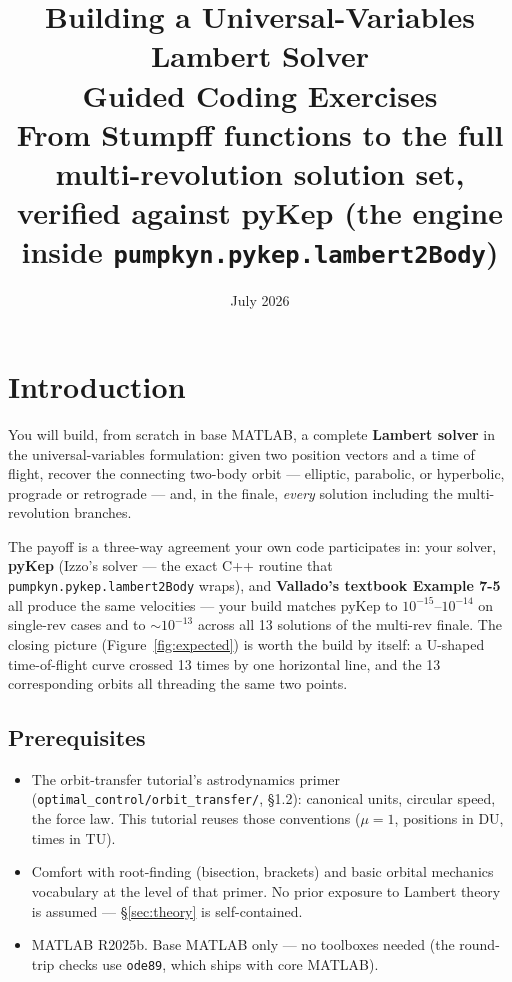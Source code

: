 \documentclass[11pt,letterpaper]{article}
\title{\textbf{Building a Universal-Variables Lambert Solver}\\[8pt]
\large Guided Coding Exercises\\[4pt]
\normalsize From Stumpff functions to the full multi-revolution solution set,\\
verified against pyKep (the engine inside \texttt{pumpkyn.pykep.lambert2Body})}
\author{}
\date{July 2026}
\begin{document}
\maketitle
\tableofcontents
\newpage

\section{Introduction}

You will build, from scratch in base MATLAB, a complete \textbf{Lambert
solver} in the universal-variables formulation: given two position vectors
and a time of flight, recover the connecting two-body orbit --- elliptic,
parabolic, or hyperbolic, prograde or retrograde --- and, in the finale,
\emph{every} solution including the multi-revolution branches.

The payoff is a three-way agreement your own code participates in: your
solver, \textbf{pyKep} (Izzo's solver --- the exact C++ routine that
\texttt{pumpkyn.pykep.lambert2Body} wraps), and \textbf{Vallado's textbook
Example 7-5} all produce the same velocities --- your build matches pyKep to
$10^{-15}$--$10^{-14}$ on single-rev cases and to $\sim$$10^{-13}$ across all
13 solutions of the multi-rev finale. The closing picture
(Figure~\ref{fig:expected}) is worth the build by itself: a U-shaped
time-of-flight curve crossed 13 times by one horizontal line, and the 13
corresponding orbits all threading the same two points.

\subsection{Prerequisites}

\begin{itemize}[leftmargin=*,nosep]
\item The orbit-transfer tutorial's astrodynamics primer
  (\texttt{optimal\_control/orbit\_transfer/}, \S1.2): canonical units,
  circular speed, the force law. This tutorial reuses those conventions
  ($\mu = 1$, positions in DU, times in TU).
\item Comfort with root-finding (bisection, brackets) and basic orbital
  mechanics vocabulary at the level of that primer. No prior exposure to
  Lambert theory is assumed --- \S\ref{sec:theory} is self-contained.
\item MATLAB R2025b. Base MATLAB only --- no toolboxes needed (the
  round-trip checks use \texttt{ode89}, which ships with core MATLAB).
\end{itemize}
\end{document}
